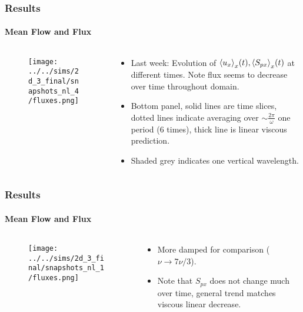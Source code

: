 \documentclass[dvipsnames]{beamer}
\DeclarePairedDelimiter\ev{\langle}{\rangle}
\begin{document}
\begin{frame}
    \frametitle{Results}
    \framesubtitle{Mean Flow and Flux}

    \begin{columns}
        \begin{column}{0.5\textwidth}
            \begin{figure}[t]
                \centering
                \texttt{[image: ../../sims/2d\_3\_final/snapshots\_nl\_4/fluxes.png]}
            \end{figure}
        \end{column}
        \begin{column}{0.5\textwidth}
            \begin{itemize}
                \item Last week: Evolution of $\ev*{u_x}_x(t),
                    \ev*{S_{px}}_x(t)$ at different times. Note flux seems to
                    decrease over time throughout domain.

                \item Bottom panel, solid lines are time slices, dotted lines
                    indicate averaging over $\sim \frac{2\pi}{\omega}$ one
                    period (6 times), thick line is linear viscous prediction.

                \item Shaded grey indicates one vertical wavelength.
            \end{itemize}
        \end{column}
    \end{columns}
\end{frame}

\begin{frame}
    \frametitle{Results}
    \framesubtitle{Mean Flow and Flux}

    \begin{columns}
        \begin{column}{0.5\textwidth}
            \begin{figure}[t]
                \centering
                \texttt{[image: ../../sims/2d\_3\_final/snapshots\_nl\_1/fluxes.png]}
            \end{figure}
        \end{column}
        \begin{column}{0.5\textwidth}
            \begin{itemize}
                \item More damped for comparison ($\nu \to 7\nu/3$).

                \item Note that $S_{px}$ does not change much over time, general
                    trend matches viscous linear decrease.
            \end{itemize}
        \end{column}
    \end{columns}
\end{frame}
\end{document}
